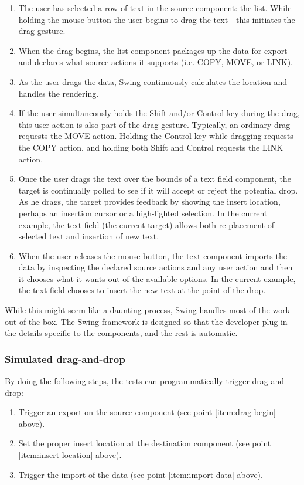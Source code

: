 \begin{enumerate}
\item The user has selected a row of text in the source component: the list. While holding the mouse button the user begins to drag the text - this initiates the drag gesture.
\item \label{item:drag-begin} When the drag begins, the list component packages up the data for export and declares what source actions it supports (i.e. COPY, MOVE, or LINK).
\item As the user drags the data, Swing continuously calculates the location and handles the rendering.
\item If the user simultaneously holds the Shift and/or Control key during the drag, this user action is also part of the drag gesture. Typically, an ordinary drag requests the MOVE action. Holding the Control key while dragging requests the COPY action, and holding both Shift and Control requests the LINK action.
\item \label{item:insert-location} Once the user drags the text over the bounds of a text field component, the target is continually polled to see if it will accept or reject the potential drop. As he drags, the target provides feedback by showing the insert location, perhaps an insertion cursor or a high-lighted selection. In the current example, the text field (the current target) allows both re-placement of selected text and insertion of new text.
\item \label{item:import-data} When the user releases the mouse button, the text component imports the data by inspecting the declared source actions and any user action and then it chooses what it wants out of the available options. In the current example, the text field chooses to insert the new text at the point of the drop.
\end{enumerate}

While this might seem like a daunting process, Swing handles most of the work out of the box. The Swing framework is designed so that the developer plug in the details specific to the components, and the rest is automatic.

\subsubsection {Simulated drag-and-drop}\label{sec:simulated-dnd}

By doing the following steps, the tests can programmatically trigger drag-and-drop:
\begin{enumerate}
\item Trigger an export on the source component (see point \ref{item:drag-begin} above).
\item Set the proper insert location at the destination component (see point \ref{item:insert-location} above).
\item Trigger the import of the data (see point \ref{item:import-data} above).
\end{enumerate}











